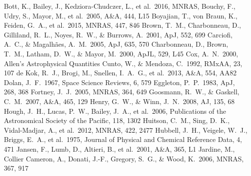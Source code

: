 \documentclass[iop]{emulateapj}
\begin{document}
\begin{thebibliography}{99}
 Bott, K., Bailey, J., Kedziora-Chudczer, L., et al.\ 2016, MNRAS, 
 Bouchy, F., Udry, S., Mayor, M., et al.\ 2005, A\&A, 444, L15
 Boyajian, T., von Braun, K., Feiden, G.~A., et al.\ 2015, MNRAS, 447, 846
 Brown, T.~M., Charbonneau, D., Gilliland, R.~L., Noyes, R.~W., \& Burrows, A.\ 2001, ApJ, 552, 699
 Carciofi, A.~C., \& Magalh{\~a}es, A.~M.\ 2005, ApJ, 635, 570 
 Charbonneau, D., Brown, T.~M., Latham, D.~W., \& Mayor, M.\ 2000, ApJL, 529, L45 
 Cox, A.~N.\ 2000, Allen's Astrophysical Quantities
 Cunto, W., \& Mendoza, C.\ 1992, RMxAA, 23, 107 
 de Kok, R.~J., Brogi, M., Snellen, I.~A.~G., et al.\ 2013, A\&A, 554, AA82
 Dolan, J.~F.\ 1967, Space Science Reviews, 6, 579
 Eggleton, P.~P.\ 1983, ApJ, 268, 368 
 Fortney, J.~J.\ 2005, MNRAS, 364, 649 
 Goosmann, R.~W., \& Gaskell, C.~M.\ 2007, A\&A, 465, 129
 Henry, G.~W., \& Winn, J.~N.\ 2008, AJ, 135, 68 
 Hough, J.~H., Lucas, P.~W., Bailey, J.~A., et al.\ 2006, Publications of the Astronomical Society of the Pacific, 118, 1302
 Huitson, C.~M., Sing, D.~K., Vidal-Madjar, A., et al.\ 2012, MNRAS, 422, 2477 
 Hubbell, J.~H., Veigele, W.~J., Briggs, E.~A., et al.\ 1975, Journal of Physical and Chemical Reference Data, 4, 471
 Jansen, F., Lumb, D., Altieri, B., et al.\ 2001, A\&A, 365, L1 
 Jardine, M., Collier Cameron, A., Donati, J.-F., Gregory, S.~G., \& Wood, K.\ 2006, MNRAS, 367, 917 

\end{thebibliography}
\end{document}

